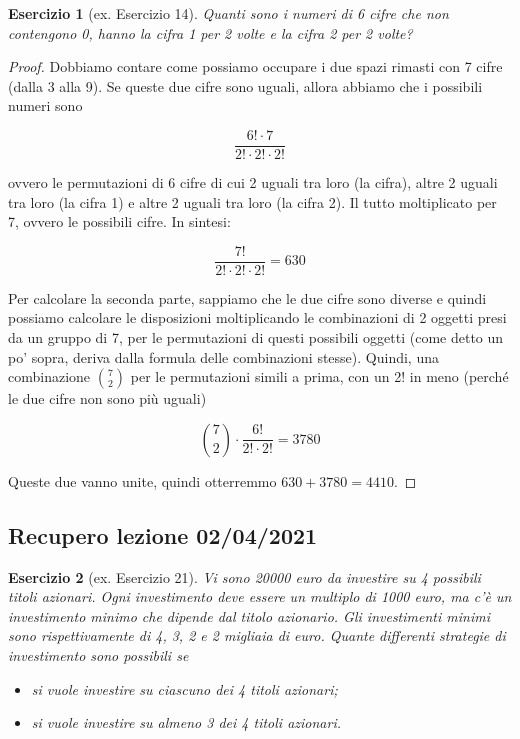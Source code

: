 \documentclass[12pt]{article}
\newtheorem{theorem}{Esercizio}
\begin{document}
\begin{theorem}[ex. Esercizio 14]
Quanti sono i numeri di 6 cifre che non contengono 0, hanno la cifra 1 per 2 volte e la cifra 2 per 2 volte?
\end{theorem}

\begin{proof}
Dobbiamo contare come possiamo occupare i due spazi rimasti con 7 cifre (dalla 3 alla 9). Se queste due cifre sono uguali, allora abbiamo che i possibili numeri sono 

$$\frac{6! \cdot 7}{2! \cdot 2! \cdot 2!}$$

ovvero le permutazioni di 6 cifre di cui 2 uguali tra loro (la cifra), altre 2 uguali tra loro (la cifra 1) e altre 2 uguali tra loro (la cifra 2). Il tutto moltiplicato per 7, ovvero le possibili cifre. In sintesi:
 
$$\frac{7!}{2! \cdot 2! \cdot 2!} = 630$$

Per calcolare la seconda parte, sappiamo che le due cifre sono diverse e quindi possiamo calcolare le disposizioni moltiplicando le combinazioni di 2 oggetti presi da un gruppo di 7, per le permutazioni di questi possibili oggetti (come detto un po' sopra, deriva dalla formula delle combinazioni stesse). Quindi, una combinazione ${7 \choose 2}$ per le permutazioni simili a prima, con un 2! in meno (perché le due cifre non sono più uguali)
 
$${7 \choose 2} \cdot \frac{6!}{2! \cdot 2!} = 3780$$

Queste due vanno unite, quindi otterremmo $630 + 3780 = 4410$.
\end{proof}


\subsection{Recupero lezione 02/04/2021}

\begin{theorem}[ex. Esercizio 21]
Vi sono 20000 euro da investire su 4 possibili titoli azionari. Ogni investimento deve essere un multiplo di 1000 euro, ma c’è un investimento minimo che dipende dal titolo azionario. Gli investimenti minimi sono rispettivamente di 4, 3, 2 e 2 migliaia di euro. Quante differenti strategie di investimento sono possibili se
\begin{itemize}
    \item si vuole investire su ciascuno dei 4 titoli azionari;
    \item si vuole investire su almeno 3 dei 4 titoli azionari.
\end{itemize}
\end{theorem}
\end{document}
